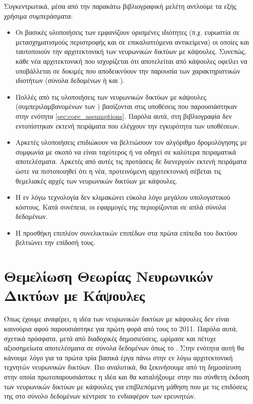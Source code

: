 Συγκεντρωτικά, μέσα από την παρακάτω βιβλιογραφική μελέτη αντλούμε τα εξής χρήσιμα συμπεράσματα:
\begin{itemize}
    \item Οι βασικές υλοποιήσεις των  εμφανίζουν ορισμένες ιδιότητες (π.χ. ευρωστία σε μετασχηματισμούς περιστροφής και σε επικαλυπτόμενα αντικείμενα) οι οποίες και ταυτοποιούν την αρχιτεκτονική των νευρωνικών δικτύων με κάψουλες. Συνεπώς, κάθε νέα αρχιτεκτονική που ισχυρίζεται ότι αποτελείται από κάψουλες οφείλει να υποβάλλεται σε δοκιμές που αποδεικνύουν την παρουσία των χαρακτηριστικών ιδιοτήτων (σύνολα δεδομένων  ή  και ).
    \item Πολλές από τις υλοποιήσεις των νευρωνικών δικτύων με κάψουλες (συμπεριλαμβανομένων των \cite{hinton2011transforming, sabour2017dynamic, hinton2018matrix}) βασίζονται στις υποθέσεις που παρουσιάστηκαν στην ενότητα \ref{sec:core_assumptions}. Παρόλα αυτά, στη βιβλιογραφία δεν εντοπίστηκαν εκτενή πειράματα που ελέγχουν την εγκυρότητα των υποθέσεων.
    \item Αρκετές υλοποιήσεις επιδιώκουν να βελτιώσουν τον αλγόριθμο δρομολόγησης με συμφωνία με σκοπό να είναι ταχύτερος ή να οδηγεί σε καλύτερα πειραματικά αποτελέσματα. Αρκετές από αυτές τις προτάσεις δε διενεργούν εκτενή πειράματα ώστε να πιστοποιηθεί ότι η νέα, προτεινόμενη αρχιτεκτονική σέβεται τις θεμελιακές αρχές των νευρωνικών δικτύων με κάψουλες.
    \item Η εν λόγω τεχνολογία δεν κλιμακώνει εύκολα λόγο μεγάλου υπολογιστικού κόστους. Κατά συνέπεια, οι εφαρμογές της περιορίζονται σε απλά σύνολα δεδομένων.
    \item Η προσθήκη επιπλέον συνελικτικών επιπέδων στα πρώτα επίπεδα του δικτύου βελτιώνει την επίδοσή τους.
\end{itemize}

\section{Θεμελίωση Θεωρίας Νευρωνικών Δικτύων με Κάψουλες}

Όπως έχουμε αναφέρει, η ιδέα των νευρωνικών δικτύων με κάψουλες δεν είναι καινούρια αφού παρουσιάστηκε για πρώτη φορά από τους  το 2011. Παρόλα αυτά, σχετικά πρόσφατα, μετά από διαδοχικές δημοσιεύσεις, ωρίμασε και πέτυχε αξιοσημείωτα αποτελέσματα σε σύνολα δεδομένων όπως το \cite{sabour2017dynamic}. Στην ενότητα αυτή θα κάνουμε λόγο για τα πρώτα τρία βασικά έργα πάνω στην εν λόγω αρχιτεκτονική τεχνητών νευρωνικών δικτύων. Πιο αναλυτικά, θα ξεκινήσουμε από τη δημοσίευση στην οποία πρωτοπαρουσιάστικε η ιδέα και θα καταλήξουμε στην πιο σύνθετη έκδοση των νευρωνικών δικτύων με κάψουλες για επιβλεπόμενη μάθηση που με τις επιδόσεις της στο σύνολο δεδομένων \cite{lecun2004learning} κέντρισε το ενδιαφέρον των ερευνητών. 

